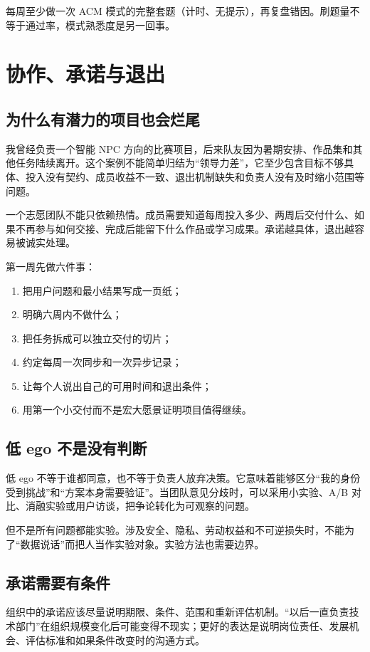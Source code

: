 \documentclass[UTF8,zihao=5,openany]{ctexbook}
\begin{document}
每周至少做一次 ACM 模式的完整套题（计时、无提示），再复盘错因。刷题量不等于通过率，模式熟悉度是另一回事。

\section{协作、承诺与退出}
\subsection{为什么有潜力的项目也会烂尾}
我曾经负责一个智能 NPC 方向的比赛项目，后来队友因为暑期安排、作品集和其他任务陆续离开。这个案例不能简单归结为“领导力差”，它至少包含目标不够具体、投入没有契约、成员收益不一致、退出机制缺失和负责人没有及时缩小范围等问题。

一个志愿团队不能只依赖热情。成员需要知道每周投入多少、两周后交付什么、如果不再参与如何交接、完成后能留下什么作品或学习成果。承诺越具体，退出越容易被诚实处理。

第一周先做六件事：\begin{enumerate}
\item 把用户问题和最小结果写成一页纸；
\item 明确六周内不做什么；
\item 把任务拆成可以独立交付的切片；
\item 约定每周一次同步和一次异步记录；
\item 让每个人说出自己的可用时间和退出条件；
\item 用第一个小交付而不是宏大愿景证明项目值得继续。
\end{enumerate}

\subsection{低 ego 不是没有判断}
低 ego 不等于谁都同意，也不等于负责人放弃决策。它意味着能够区分“我的身份受到挑战”和“方案本身需要验证”。当团队意见分歧时，可以采用小实验、A/B 对比、消融实验或用户访谈，把争论转化为可观察的问题。

但不是所有问题都能实验。涉及安全、隐私、劳动权益和不可逆损失时，不能为了“数据说话”而把人当作实验对象。实验方法也需要边界。

\subsection{承诺需要有条件}
组织中的承诺应该尽量说明期限、条件、范围和重新评估机制。“以后一直负责技术部门”在组织规模变化后可能变得不现实；更好的表达是说明岗位责任、发展机会、评估标准和如果条件改变时的沟通方式。
\end{document}
